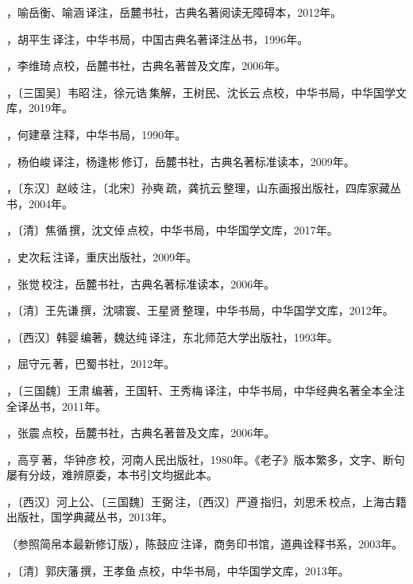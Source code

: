 ，喻岳衡、喻涵\,译注，岳麓书社，古典名著阅读无障碍本，2012年。

，胡平生\,译注，中华书局，中国古典名著译注丛书，1996年。

，李维琦\,点校，岳麓书社，古典名著普及文库，2006年。

，〔三国吴〕韦昭\,注，徐元诰\,集解，王树民、沈长云\,点校，中华书局，中华国学文库，2019年。

，何建章\,注释，中华书局，1990年。

，杨伯峻\,译注，杨逢彬\,修订，岳麓书社，古典名著标准读本，2009年。

，〔东汉〕赵岐\,注，〔北宋〕孙奭\,疏，龚抗云\,整理，山东画报出版社，四库家藏丛书，2004年。

，〔清〕焦循\,撰，沈文倬\,点校，中华书局，中华国学文库，2017年。

，史次耘\,注译，重庆出版社，2009年。

，张觉\,校注，岳麓书社，古典名著标准读本，2006年。

，〔清〕王先谦\,撰，沈啸寰、王星贤\,整理，中华书局，中华国学文库，2012年。

，〔西汉〕韩婴\,编著，魏达纯\,译注，东北师范大学出版社，1993年。

，屈守元\,著，巴蜀书社，2012年。

，〔三国魏〕王肃\,编著，王国轩、王秀梅\,译注，中华书局，中华经典名著全本全注全译丛书，2011年。

，张震\,点校，岳麓书社，古典名著普及文库，2006年。

，高亨\,著，华钟彦\,校，河南人民出版社，1980年。《老子》版本繁多，文字、断句屡有分歧，难辨原委，本书引文均据此本。

，〔西汉〕河上公、〔三国魏〕王弼\,注，〔西汉〕严遵\,指归，刘思禾\,校点，上海古籍出版社，国学典藏丛书，2013年。

（参照简帛本最新修订版），陈鼓应\,注译，商务印书馆，道典诠释书系，2003年。

，〔清〕郭庆藩\,撰，王孝鱼\,点校，中华书局，中华国学文库，2013年。

